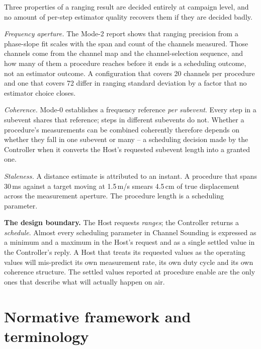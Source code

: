 \documentclass[11pt,a4paper]{article}
\begin{document}
Three properties of a ranging result are decided entirely at campaign level, and no amount of
per-step estimator quality recovers them if they are decided badly.

\emph{Frequency aperture.} The Mode-2 report shows that ranging precision from a phase-slope fit
scales with the span and count of the channels measured. Those channels come from the channel map and
the channel-selection sequence, and how many of them a procedure reaches before it ends is a
scheduling outcome, not an estimator outcome. A configuration that covers 20 channels per procedure
and one that covers 72 differ in ranging standard deviation by a factor that no estimator choice
closes.

\emph{Coherence.} Mode-0 establishes a frequency reference \emph{per subevent}. Every step in a
subevent shares that reference; steps in different subevents do not. Whether a procedure's
measurements can be combined coherently therefore depends on whether they fall in one subevent or
many -- a scheduling decision made by the Controller when it converts the Host's requested subevent
length into a granted one.

\emph{Staleness.} A distance estimate is attributed to an instant. A procedure that spans 30\,ms
against a target moving at 1.5\,m/s smears 4.5\,cm of true displacement across the measurement
aperture. The procedure length is a scheduling parameter.

\begin{callout}
\textbf{The design boundary.} The Host requests \emph{ranges}; the Controller returns a
\emph{schedule}. Almost every scheduling parameter in Channel Sounding is expressed as a minimum and
a maximum in the Host's request and as a single settled value in the Controller's reply. A Host that
treats its requested values as the operating values will mis-predict its own measurement rate, its
own duty cycle and its own coherence structure. The settled values reported at procedure enable are
the only ones that describe what will actually happen on air.
\end{callout}

\section{Normative framework and terminology}
\label{sec:norm-frame}
\end{document}
